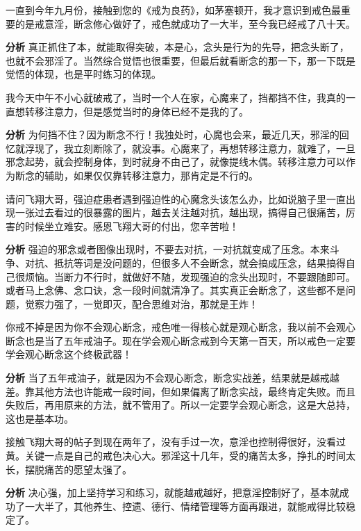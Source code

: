 \begin{case}
    一直到今年九月份，接触到您的《戒为良药》，如茅塞顿开，我才意识到戒色最重要的是戒意淫，断念修心做好了，戒色就成功了一大半，至今我已经戒了八十天。

    \textbf{分析} 真正抓住了本，就能取得突破，本是心，念头是行为的先导，把念头断了，也就不会邪淫了。当然综合觉悟也很重要，但最后就看断念的那一下，那一下既是觉悟的体现，也是平时练习的体现。
\end{case}

\begin{case}
    我今天中午不小心就破戒了，当时一个人在家，心魔来了，挡都挡不住，我真的一直想转移注意力，但是感觉当时的身体已经不是我的了。

    \textbf{分析} 为何挡不住？因为断念不行！我独处时，心魔也会来，最近几天，邪淫的回忆就浮现了，我立刻断除了，就没事。心魔来了，再想转移注意力，就难了，一旦邪念起势，就会控制身体，到时就身不由己了，就像提线木偶。转移注意力可以作为断念的辅助，如果仅仅靠转移注意力，那肯定是不行的。
\end{case}

\begin{case}
    请问飞翔大哥，强迫症患者遇到强迫性的心魔念头该怎么办，比如说脑子里一直出现一张过去看过的很暴露的图片，越去关注越对抗，越出现，搞得自己很痛苦，厉害的时候坐立难安。感恩飞翔大哥的付出，您辛苦啦！

    \textbf{分析} 强迫的邪念或者图像出现时，不要去对抗，一对抗就变成了压念。本来斗争、对抗、抵抗等词是没问题的，但很多人不会断念，就会搞成压念，结果搞得自己很烦恼。当断力不行时，就做好不随，发现强迫的念头出现时，不要跟随即可。或者马上念佛、念口诀，念一段时间就清净了。其实真正会断念了，这些都不是问题，觉察力强了，一觉即灭，配合思维对治，那就是王炸！
\end{case}

\begin{case}
    你戒不掉是因为你不会观心断念，戒色唯一得核心就是观心断念，我以前不会观心断念也是当了五年戒油子。现在学会观心断念戒到今天第一百天，所以戒色一定要学会观心断念这个终极武器！

    \textbf{分析} 当了五年戒油子，就是因为不会观心断念，断念实战差，结果就是越戒越差。靠其他方法也许能戒一段时间，但如果偏离了断念实战，最终肯定失败。而且失败后，再用原来的方法，就不管用了。所以一定要学会观心断念，这是大总持，这也是基本功。
\end{case}

\begin{case}
    接触飞翔大哥的帖子到现在两年了，没有手过一次，意淫也控制得很好，没看过黄。关键一点是自己的戒色决心大。邪淫这十几年，受的痛苦太多，挣扎的时间太长，摆脱痛苦的愿望太强了。

    \textbf{分析} 决心强，加上坚持学习和练习，就能越戒越好，把意淫控制好了，基本就成功了一大半了，其他养生、控遗、德行、情绪管理等方面再跟进，就能戒得比较稳定了。
\end{case}


